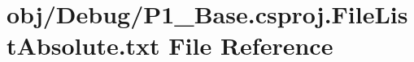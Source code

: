 \hypertarget{_debug_2_p1___base_8csproj_8_file_list_absolute_8txt}{\section{obj/\-Debug/\-P1\-\_\-\-Base.csproj.\-File\-List\-Absolute.\-txt File Reference}
\label{_debug_2_p1___base_8csproj_8_file_list_absolute_8txt}
}
